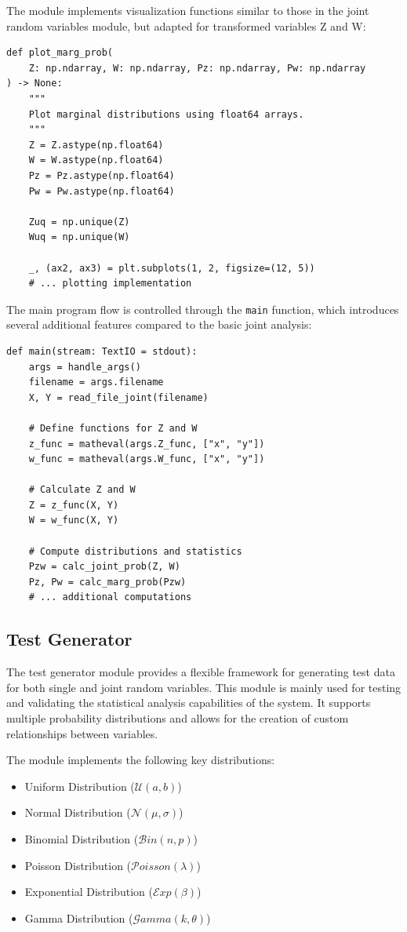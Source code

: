 \documentclass{article}
\begin{document}
The module implements visualization functions similar to those in the joint random variables module, but adapted for transformed variables Z and W:

\begin{verbatim}
def plot_marg_prob(
    Z: np.ndarray, W: np.ndarray, Pz: np.ndarray, Pw: np.ndarray
) -> None:
    """
    Plot marginal distributions using float64 arrays.
    """
    Z = Z.astype(np.float64)
    W = W.astype(np.float64)
    Pz = Pz.astype(np.float64)
    Pw = Pw.astype(np.float64)

    Zuq = np.unique(Z)
    Wuq = np.unique(W)

    _, (ax2, ax3) = plt.subplots(1, 2, figsize=(12, 5))
    # ... plotting implementation
\end{verbatim}

The main program flow is controlled through the \texttt{main} function, which introduces several additional features compared to the basic joint analysis:

\begin{verbatim}
def main(stream: TextIO = stdout):
    args = handle_args()
    filename = args.filename
    X, Y = read_file_joint(filename)

    # Define functions for Z and W
    z_func = matheval(args.Z_func, ["x", "y"])
    w_func = matheval(args.W_func, ["x", "y"])

    # Calculate Z and W
    Z = z_func(X, Y)
    W = w_func(X, Y)

    # Compute distributions and statistics
    Pzw = calc_joint_prob(Z, W)
    Pz, Pw = calc_marg_prob(Pzw)
    # ... additional computations
\end{verbatim}

\subsection{Test Generator}

The test generator module provides a flexible framework for generating test data for both single and joint random variables. This module is mainly used for testing and validating the statistical analysis capabilities of the system. It supports multiple probability distributions and allows for the creation of custom relationships between variables.

The module implements the following key distributions:

\begin{itemize}
  \item Uniform Distribution ($\mathcal{U}(a,b)$)
  \item Normal Distribution ($\mathcal{N}(\mu,\sigma)$)
  \item Binomial Distribution ($\mathcal{B}in(n,p)$)
  \item Poisson Distribution ($\mathcal{P}oisson(\lambda)$)
  \item Exponential Distribution ($\mathcal{E}xp(\beta)$)
  \item Gamma Distribution ($\mathcal{G}amma(k,\theta)$)
\end{itemize}
\end{document}
